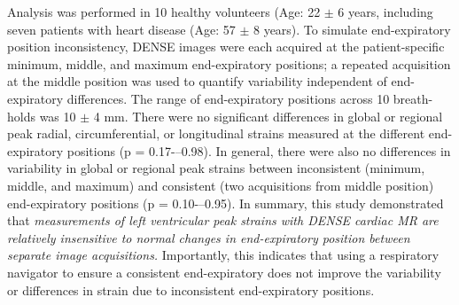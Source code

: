 	Analysis was performed in 10 healthy volunteers (Age: 22 $\pm$ 6 years, including seven patients with heart disease (Age: 57 $\pm$ 8 years). To simulate end-expiratory position inconsistency, DENSE images were each acquired at the patient-specific minimum, middle, and maximum end-expiratory positions; a repeated acquisition at the middle position was used to quantify variability independent of end-expiratory differences. The range of end-expiratory positions across 10 breath-holds was 10 $\pm$ 4 mm. There were no significant differences in global or regional peak radial, circumferential, or longitudinal strains measured at the different end-expiratory positions (p = 0.17-–0.98). In general, there were also no differences in variability in global or regional peak strains between inconsistent (minimum, middle, and maximum) and consistent (two acquisitions from middle position) end-expiratory positions (p = 0.10-–0.95). In summary, this study demonstrated that \textit{measurements of left ventricular peak strains with DENSE cardiac MR are relatively insensitive to normal changes in end-expiratory position between separate image acquisitions.} Importantly, this indicates that using a respiratory navigator to ensure a consistent end-expiratory does not improve the variability or differences in strain due to inconsistent end-expiratory positions.
	
